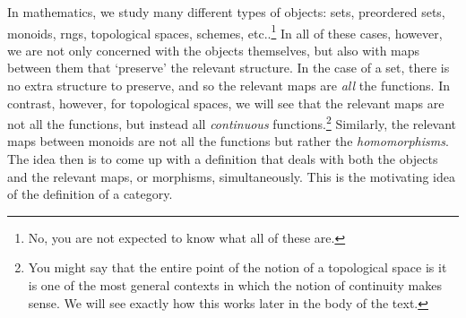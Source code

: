 In mathematics, we study many different types of objects:  sets, preordered sets, monoids, rngs, topological spaces, schemes, etc..\footnote{No, you are not expected to know what all of these are.}  In all of these cases, however, we are not only concerned with the objects themselves, but also with maps between them that `preserve' the relevant structure.  In the case of a set, there is no extra structure to preserve, and so the relevant maps are \emph{all} the functions.  In contrast, however, for topological spaces, we will see that the relevant maps are not all the functions, but instead all \emph{continuous} functions.\footnote{You might say that the entire point of the notion of a topological space is it is one of the most general contexts in which the notion of continuity makes sense.  We will see exactly how this works later in the body of the text.}  Similarly, the relevant maps between monoids are not all the functions but rather the \emph{homomorphisms}.  The idea then is to come up with a definition that deals with both the objects and the relevant maps, or morphisms, simultaneously.  This is the motivating idea of the definition of a category.
